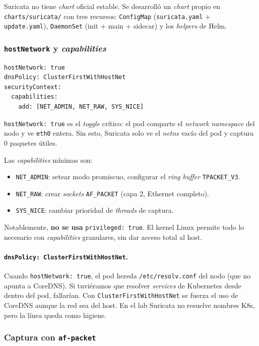 Suricata no tiene \emph{chart} oficial estable. Se desarrolló un \emph{chart} propio en \texttt{charts/suricata/} con tres recursos: \texttt{ConfigMap} (\texttt{suricata.yaml} + \texttt{update.yaml}), \texttt{DaemonSet} (init + main + sidecar) y los \emph{helpers} de Helm.

\subsubsection{\texttt{hostNetwork} y \emph{capabilities}}

\begin{lstlisting}[style=yaml]
hostNetwork: true
dnsPolicy: ClusterFirstWithHostNet
securityContext:
  capabilities:
    add: [NET_ADMIN, NET_RAW, SYS_NICE]
\end{lstlisting}

\texttt{hostNetwork: true} es el \emph{toggle} crítico: el pod comparte el \emph{network namespace} del nodo y ve \texttt{eth0} entera. Sin esto, Suricata solo ve el \emph{netns} vacío del pod y captura 0 paquetes útiles.

Las \emph{capabilities} mínimas son:
\begin{itemize}
  \item \texttt{NET\_ADMIN}: setear modo promiscuo, configurar el \emph{ring buffer} \texttt{TPACKET\_V3}.
  \item \texttt{NET\_RAW}: crear \emph{sockets} \texttt{AF\_PACKET} (capa 2, Ethernet completo).
  \item \texttt{SYS\_NICE}: cambiar prioridad de \emph{threads} de captura.
\end{itemize}

Notablemente, \textbf{no se usa} \texttt{privileged: true}. El kernel Linux permite todo lo necesario con \emph{capabilities} granulares, sin dar acceso total al host.

\paragraph{\texttt{dnsPolicy: ClusterFirstWithHostNet}.} Cuando \texttt{hostNetwork: true}, el pod hereda \texttt{/etc/resolv.conf} del nodo (que no apunta a CoreDNS). Si tuviéramos que resolver \emph{services} de Kubernetes desde dentro del pod, fallarían. Con \texttt{ClusterFirstWithHostNet} se fuerza el uso de CoreDNS aunque la red sea del host. En el lab Suricata no resuelve nombres K8s, pero la línea queda como higiene.

\subsubsection{Captura con \texttt{af-packet}}

